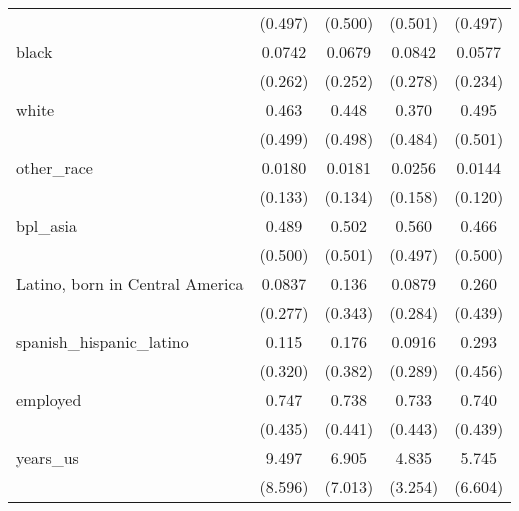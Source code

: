 \begin{table}[htbp]
\begin{tabular}{l*{4}{c}}
                    &     (0.497)         &     (0.500)         &     (0.501)         &     (0.497)         \\
[1em]
black               &      0.0742         &      0.0679         &      0.0842         &      0.0577         \\
                    &     (0.262)         &     (0.252)         &     (0.278)         &     (0.234)         \\
[1em]
white               &       0.463         &       0.448         &       0.370         &       0.495         \\
                    &     (0.499)         &     (0.498)         &     (0.484)         &     (0.501)         \\
[1em]
other\_race          &      0.0180         &      0.0181         &      0.0256         &      0.0144         \\
                    &     (0.133)         &     (0.134)         &     (0.158)         &     (0.120)         \\
[1em]
bpl\_asia            &       0.489         &       0.502         &       0.560         &       0.466         \\
                    &     (0.500)         &     (0.501)         &     (0.497)         &     (0.500)         \\
[1em]
Latino, born in Central America&      0.0837         &       0.136         &      0.0879         &       0.260         \\
                    &     (0.277)         &     (0.343)         &     (0.284)         &     (0.439)         \\
[1em]
spanish\_hispanic\_latino&       0.115         &       0.176         &      0.0916         &       0.293         \\
                    &     (0.320)         &     (0.382)         &     (0.289)         &     (0.456)         \\
[1em]
employed            &       0.747         &       0.738         &       0.733         &       0.740         \\
                    &     (0.435)         &     (0.441)         &     (0.443)         &     (0.439)         \\
[1em]
years\_us            &       9.497         &       6.905         &       4.835         &       5.745         \\
                    &     (8.596)         &     (7.013)         &     (3.254)         &     (6.604)         \\

\end{tabular}
\end{table}
